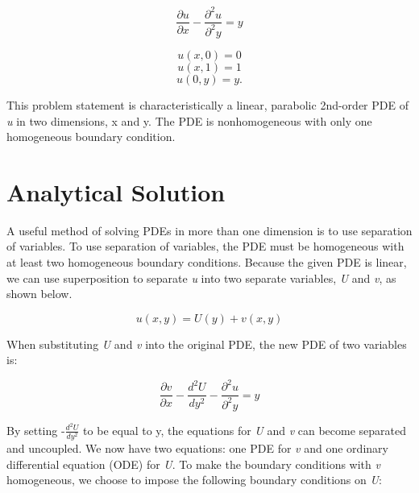 \documentclass[10pt]{article}
\begin{document}
\begin{equation}
\frac{\partial u}{\partial x} - \frac{\partial^2 u}{\partial^2 y} = y
\label{pde}
\end{equation}


\begin{multicols}{3}
\noindent
    \begin{equation}
	u(x, 0) = 0
	\label{u_bc1}
	\end{equation}
\noindent
	\begin{equation}
	u(x, 1) = 1
	\label{u_bc2}
	\end{equation}
\noindent
	\begin{equation}
	u(0, y) = y.
	\label{u_bc3}
	\end{equation}
\end{multicols}


This problem statement is characteristically a linear, parabolic 2nd-order PDE of \textit{u} in two dimensions, x and y. The PDE is nonhomogeneous with only one homogeneous boundary condition. 

\section*{Analytical Solution}
\vspace{-8pt}
A useful method of solving PDEs in more than one dimension is to use separation of variables. To use separation of variables, the PDE must be homogeneous with at least two homogeneous boundary conditions. Because the given PDE is linear, we can use superposition to separate \textit{u} into two separate variables, \textit{U} and \textit{v}, as shown below.


\begin{equation}
u(x, y) = U(y) + v(x, y)
\label{u_U_v}
\end{equation}

When substituting \textit{U} and \textit{v} into the original PDE, the new PDE of two variables is:

\begin{equation}
\frac{\partial v}{\partial x} - \frac{d^2U}{dy^2} - \frac{\partial^2 u}{\partial^2 y} = y
\label{U_v_pde}
\end{equation}

By setting -$\frac{d^2U}{dy^2}$ to be equal to y, the equations for \textit{U} and \textit{v} can become separated and uncoupled. We now have two equations: one PDE for \textit{v} and one ordinary differential equation (ODE) for \textit{U}. To make the boundary conditions with \textit{v} homogeneous, we choose to impose the following boundary conditions on \textit{U}:
\end{document}
